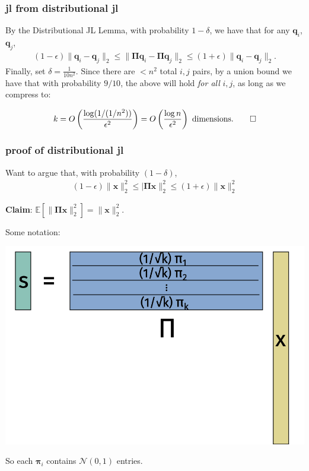 \documentclass[compress]{beamer}
\newcommand{\bs}[1]{\boldsymbol{#1}}
\newcommand{\bv}[1]{\mathbf{#1}}
\newcommand{\E}{\mathbb{E}}
\begin{document}
\begin{frame}
	\frametitle{jl from distributional jl}
	By the Distributional JL Lemma, with probability $1-\delta$, we have that for any $\bv{q}_i$, $\bv{q}_j$,
	\begin{align*}
		(1-\epsilon)\|\bv{q}_i - \bv{q}_j\|_2 \leq \|\bs{\Pi}\bv{q}_i - \bs{\Pi}\bv{q}_j\|_2 \leq (1+\epsilon) \|\bv{q}_i - \bv{q}_j\|_2.
	\end{align*}
	Finally, set $\delta = \frac{1}{10n^2}$. Since there are $< n^2$ total $i,j$ pairs, by a union bound we have that with probability $9/10$, the above will hold \emph{for all} $i,j$, as long as we compress to:
	
	\begin{align*}
		k = O\left(\frac{\log(1/(1/n^2))}{\epsilon^2}\right) = O\left(\frac{\log n}{\epsilon^2}\right) \text{ dimensions.}\qed
	\end{align*}
	
\end{frame}

\begin{frame}
	\frametitle{proof of distributional jl}
	Want to argue that, with probability $(1-\delta)$,
	\begin{align*}
		(1-\epsilon)\|\bv{x}\|_2^2 \leq |\bs{\Pi}\bv{x}\|_2^2 \leq (1+\epsilon)\|\bv{x}\|_2^2 
	\end{align*}
	
	\begin{center}
		\alert{\textbf{Claim}: $\E \left[\|\bs{\Pi} \bv{x} \|_2^2\right] = \|\bv{x}\|_2^2.$}
	\end{center}
	
	\vspace{-1em}
	Some notation:
	\begin{center}
		\includegraphics[width=.6\textwidth]{jl_notation.png}
		
		So each $\bs{\pi}_i$ contains $\mathcal{N}(0,1)$ entries. 
	\end{center}
\end{frame}
\end{document}

